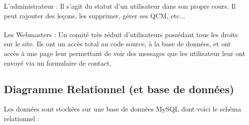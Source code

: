 \documentclass[a4paper,10pt]{article}
\begin{document}
L'administrateur : Il s'agit du statut d'un utilisateur dans son propre cours. Il peut rajouter des leçons, les supprimer, gérer ses QCM, etc...\\\\

Les Webmasters : Un comité très réduit d'utilisateurs possédant tous les droits sur le site. Ils ont un accès total au code source, à la base de données, et ont accès à une page leur permettant de voir des messages que les utilisateur leur ont envoyé via un formulaire de contact.
\newpage
\subsection{Diagramme Relationnel (et base de données)}

Les données sont stockées sur une base de données MySQL dont voici le schéma relationnel : \\\\
\end{document}

